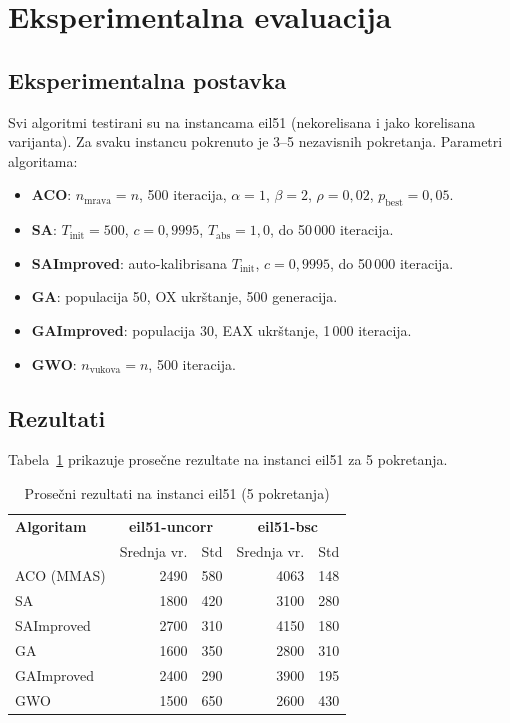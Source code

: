 \documentclass[12pt,a4paper]{article}
\begin{document}
\section{Eksperimentalna evaluacija}

\subsection{Eksperimentalna postavka}

Svi algoritmi testirani su na instancama eil51 (nekorelisana i jako korelisana varijanta). Za svaku instancu pokrenuto je 3--5 nezavisnih pokretanja. Parametri algoritama:
\begin{itemize}
    \item \textbf{ACO}: $n_{\text{mrava}} = n$, 500 iteracija, $\alpha=1$, $\beta=2$, $\rho=0{,}02$, $p_{\text{best}}=0{,}05$.
    \item \textbf{SA}: $T_{\text{init}} = 500$, $c = 0{,}9995$, $T_{\text{abs}} = 1{,}0$, do 50\,000 iteracija.
    \item \textbf{SAImproved}: auto-kalibrisana $T_{\text{init}}$, $c = 0{,}9995$, do 50\,000 iteracija.
    \item \textbf{GA}: populacija 50, OX ukrštanje, 500 generacija.
    \item \textbf{GAImproved}: populacija 30, EAX ukrštanje, 1\,000 iteracija.
    \item \textbf{GWO}: $n_{\text{vukova}} = n$, 500 iteracija.
\end{itemize}

\subsection{Rezultati}

Tabela~\ref{tab:results} prikazuje prose\v{c}ne rezultate na instanci eil51 za 5 pokretanja.

\begin{table}[h]
\centering
\caption{Prose\v{c}ni rezultati na instanci eil51 (5 pokretanja)}
\label{tab:results}
\begin{tabular}{lrrrr}
\toprule
\textbf{Algoritam} & \multicolumn{2}{c}{\textbf{eil51-uncorr}} & \multicolumn{2}{c}{\textbf{eil51-bsc}} \\
 & Srednja vr. & Std & Srednja vr. & Std \\
\midrule
ACO (MMAS) & 2490 & 580 & 4063 & 148 \\
SA & 1800 & 420 & 3100 & 280 \\
SAImproved & 2700 & 310 & 4150 & 180 \\
GA & 1600 & 350 & 2800 & 310 \\
GAImproved & 2400 & 290 & 3900 & 195 \\
GWO & 1500 & 650 & 2600 & 430 \\
\bottomrule
\end{tabular}
\end{table}
\end{document}
